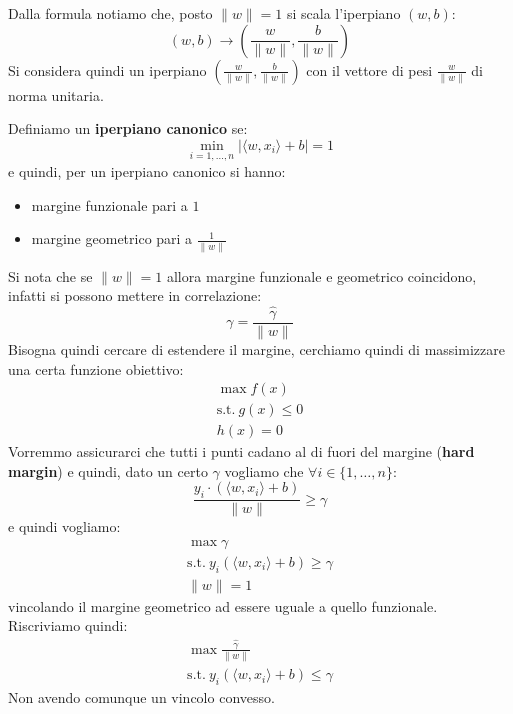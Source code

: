 Dalla formula notiamo che, posto $\| w \| = 1$ si scala l'iperpiano $(w, b)$:
\begin{equation}
    (w, b) \to \left(\frac{w}{\|w\|}, \frac{b}{\| w\|}\right)
\end{equation}
Si considera quindi un iperpiano $\left(\frac{w}{\|w\|}, \frac{b}{\| w\|}\right)$
con il vettore di pesi $\frac{w}{\| w \|}$ di norma unitaria.
\begin{definizione}
    Definiamo un \textbf{iperpiano canonico} se:
    \begin{equation}
        \min_{i = 1, \dots, n} |\langle w, x_i \rangle + b| =  1
    \end{equation}
    e quindi, per un iperpiano canonico si hanno:
    \begin{itemize}
        \item margine funzionale pari a $1$
        \item margine geometrico pari a $\frac{1}{\| w \|}$
    \end{itemize}
\end{definizione}
Si nota che se $\| w \| = 1$ allora margine funzionale e geometrico coincidono,
infatti si possono mettere in correlazione:
\begin{equation}
    \gamma = \frac{\hat{\gamma}}{\| w \|}
\end{equation}
Bisogna quindi cercare di estendere il margine, cerchiamo quindi di massimizzare
una certa funzione obiettivo:
\begin{equation*}
    \begin{aligned}
        \max f(x) \\ \text{s.t.} \ g(x) \leq 0 \\ h(x) = 0
    \end{aligned}
\end{equation*}
Vorremmo assicurarci che tutti i punti cadano al di fuori del margine
(\textbf{hard margin}) e quindi, dato un certo $\gamma$ vogliamo che $\forall i
    \in \{1, \dots, n\}$:
\begin{equation}
    \frac{y_i \cdot (\langle w, x_i \rangle + b)}{\| w \|} \geq \gamma
\end{equation}
e quindi vogliamo:
\begin{equation*}
    \begin{aligned}
        \max \gamma \\ \text{s.t.} \ y_i (\langle w, x_i \rangle + b) \geq
        \gamma      \\ \| w \| = 1
    \end{aligned}
\end{equation*}
vincolando il margine geometrico ad essere uguale a quello funzionale.
Riscriviamo quindi:
\begin{equation*}
    \begin{aligned}
        \max \frac{\hat{\gamma}}{\|w\|} \\ \text{s.t.} \ y_i(\langle w, x_i
        \rangle + b) \leq \gamma
    \end{aligned}
\end{equation*}
Non avendo comunque un vincolo convesso.

